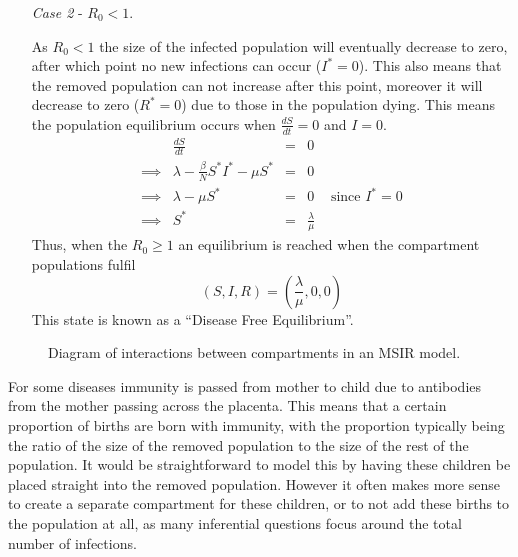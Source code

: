 \documentclass[11pt,a4paper]{article}
\theoremstyle{break}
\begin{document}
\begin{box_remark}
\begin{itemize}
      \item[\textit{Case 2}] - $R_0<1$.
      \par As $R_0<1$ the size of the infected population will eventually decrease to zero, after which point no new infections can occur ($I^*=0$). This also means that the removed population can not increase after this point, moreover it will decrease to zero ($R^*=0$) due to those in the population dying. This means the population equilibrium occurs when $\frac{dS}{dt}=0$ and $I=0$.
      \[\begin{array}{rrcll}
        &\frac{dS}{dt}&=&0\\
        \implies&\lambda-\frac\beta{N} S^*I^*-\mu S^*&=&0&\\
        \implies&\lambda-\mu S^*&=&0&\text{ since }I^*=0\\
        \implies&S^*&=&\frac\lambda\mu
      \end{array}\]
      Thus, when the $R_0\geq1$ an equilibrium is reached when the compartment populations fulfil
      \[ (S,I,R)=\left(\frac\lambda\mu,0,0\right) \]
      This state is known as a ``Disease Free Equilibrium''.
    \end{itemize}
  \end{box_remark}

  \begin{figure}[H]
    \centering
    \caption{Diagram of interactions between compartments in an MSIR model.}
    \label{fig_msir_model_diagram}
  \end{figure}

  \par For some diseases immunity is passed from mother to child due to antibodies from the mother passing across the placenta. This means that a certain proportion of births are born with immunity, with the proportion typically being the ratio of the size of the removed population to the size of the rest of the population. It would be straightforward to model this by having these children be placed straight into the removed population. However it often makes more sense to create a separate compartment for these children, or to not add these births to the population at all, as many inferential questions focus around the total number of infections.
\end{document}
